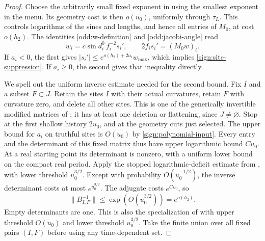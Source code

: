 \begin{proof}
Choose the arbitrarily small fixed exponent in
 using the smallest exponent in the menu.
Its geometry cost is then \(o(u_0)\), uniformly through \(\tau_L\).
This controls logarithms of the sines and lengths, and hence all
entries of \(M_0\), at cost \(o(h_2)\).
The identities \eqref{odd:w-definition} and
\eqref{odd:jacobi-angle} read
\begin{equation}\label{sign:two-identities}
 w_i=c\sin d_i^0\,f_i^{-2}s_i',\qquad
       2f_i s_i'=(M_0w)_i.
\end{equation}
If \(a_i<0\), the first gives
\(|s_i'|\le e^{o(h_2)+2a_i}w_{\max}\), which implies
\eqref{sign:site-suppression}.  If \(a_i\ge0\), the second gives
that inequality directly.

We spell out the uniform inverse estimate needed for the second
bound.  Fix \(I\) and a subset \(F\subset J\).  Retain the sites
\(I\) with their actual curvatures, retain \(F\) with curvature
zero, and delete all other sites.  This is one of the generically
invertible modified matrices of ; it has at
least one deletion or flattening, since \(J\ne\varnothing\).
Stop at the first shallow history \(2u_0\), and at the geometry
cuts just selected.  The upper bound for \(a_i\) on truthful sites
is \(O(u_0)\) by \eqref{sign:polynomial-input}.  Every entry and
the determinant of this fixed matrix thus have upper logarithmic
bound \(Cu_0\).  At a real starting point its determinant is
nonzero, with a uniform lower bound on the compact real period.
Apply the stopped logarithmic-deficit estimate from
, with lower threshold \(u_0^{3/2}\).
Except with probability \(O(u_0^{-1/2})\), the inverse determinant
costs at most \(e^{u_0^{3/2}}\).  The adjugate costs \(e^{Cu_0}\),
so
\begin{equation}\label{sign:modified-inverse}
 \|B_{I,F}^{-1}\|
       \le \exp(O(u_0^{3/2}))=e^{o(h_2)}.
\end{equation}
Empty determinants are one.  This is also the specialization of
 with upper threshold \(O(u_0)\) and
lower threshold \(u_0^{3/2}\).  Take the finite union over all
fixed pairs \((I,F)\) before using any time-dependent set.


\end{proof}
